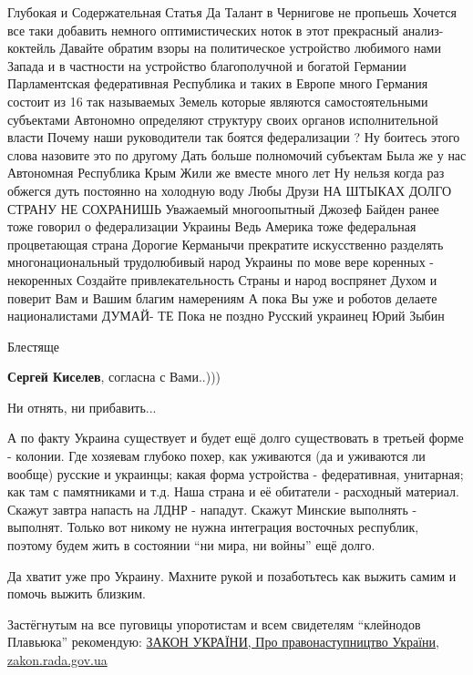 \begin{itemize}

Глубокая и Содержательная Статья Да Талант в Чернигове не пропьешь Хочется все
таки добавить немного оптимистических ноток в этот прекрасный анализ- коктейль
Давайте обратим взоры на политическое устройство любимого нами Запада и в
частности на устройство благополучной и богатой Германии Парламентская
федеративная Республика и таких в Европе много Германия состоит из 16 так
называемых Земель которые являются самостоятельными субъектами Автономно
определяют структуру своих органов исполнительной власти Почему наши
руководители так боятся федерализации ? Ну боитесь этого слова назовите это по
другому Дать больше полномочий субъектам Была же у нас Автономная Республика
Крым Жили же вместе много лет Ну нельзя когда раз обжегся дуть постоянно на
холодную воду Любы Друзи НА ШТЫКАХ ДОЛГО СТРАНУ НЕ СОХРАНИШЬ Уважаемый
многоопытный Джозеф Байден ранее тоже говорил о федерализации Украины Ведь
Америка тоже федеральная процветающая страна Дорогие Керманычи прекратите
искусственно разделять многонациональный трудолюбивый народ Украины по мове
вере коренных - некоренных Создайте привлекательность Страны и народ воспрянет
Духом и поверит Вам и Вашим благим намерениям А пока Вы уже и роботов делаете
националистами ДУМАЙ- ТЕ Пока не поздно Русский украинец Юрий Зыбин

Блестяще

\textbf{Сергей Киселев}, согласна с Вами..)))

Ни отнять, ни прибавить...


А по факту Украина существует и будет ещё долго существовать в третьей форме -
колонии. Где хозяевам глубоко похер, как уживаются (да и уживаются ли вообще)
русские и украинцы; какая форма устройства - федеративная, унитарная; как там с
памятниками и т.д. Наша страна и её обитатели - расходный материал. Скажут
завтра напасть на ЛДНР - нападут. Скажут Минские выполнять - выполнят. Только
вот никому не нужна интеграция восточных республик, поэтому будем жить в
состоянии \enquote{ни мира, ни войны} ещё долго.


Да хватит уже про Украину. Махните рукой и позаботьтесь как выжить самим и
помочь выжить близким.


Застёгнутым на все пуговицы упоротистам и всем свидетелям \enquote{клейнодов Плавьюка}
рекомендую: \href{https://zakon.rada.gov.ua/laws/show/1543-12#Text}{%
ЗАКОН УКРАЇНИ, Про правонаступництво України, zakon.rada.gov.ua%
}


\end{itemize}
